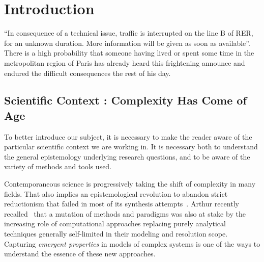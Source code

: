 




%
%
%
%


\chapter*{Introduction}




``In consequence of a technical issue, traffic is interrupted on the line B of RER, for an unknown duration. More information will be given as soon as available''. There is a high probability that someone having lived or spent some time in the metropolitan region of Paris  has already heard this frightening announce and endured the difficult consequences the rest of his day.





\section*{Scientific Context : Complexity Has Come of Age}


To better introduce our subject, it is necessary to make the reader aware of the particular scientific context we are working in. It is necessary both to understand the general epistemology underlying research questions, and to be aware of the variety of methods and tools used.


Contemporaneous science is progressively taking the shift of complexity in many fields. That also implies an epistemological revolution to abandon strict reductionism that failed in most of its synthesis attempts~\cite{anderson1972more}. Arthur recently recalled~\cite{arthur2015complexity} that a mutation of methods and paradigms was also at stake by the increasing role of computational approaches replacing purely analytical techniques generally self-limited in their modeling and resolution scope. Capturing \emph{emergent properties} in models of complex systems is one of the ways to understand the essence of these new approaches.

